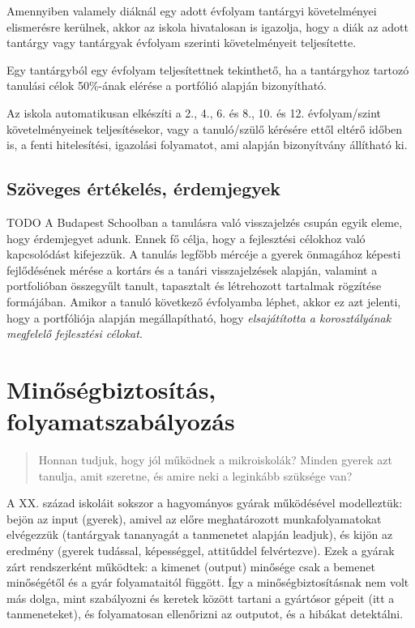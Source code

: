Amennyiben valamely diáknál egy adott évfolyam tantárgyi követelményei elismerésre kerülnek, akkor az iskola hivatalosan is igazolja, hogy a diák az adott tantárgy vagy tantárgyak évfolyam szerinti követelményeit teljesítette.

Egy tantárgyból egy évfolyam teljesítettnek tekinthető, ha a tantárgyhoz tartozó tanulási célok 50\%-ának elérése a portfólió alapján bizonyítható.

Az iskola automatikusan elkészíti a 2., 4., 6. és 8., 10. és 12. évfolyam/szint követelményeinek teljesítésekor, vagy a tanuló/szülő kérésére ettől eltérő időben is, a fenti hitelesítési, igazolási folyamatot, ami alapján bizonyítvány állítható ki.

\subsection{Szöveges értékelés, érdemjegyek}
TODO
A Budapest Schoolban a tanulásra való visszajelzés csupán egyik eleme, hogy érdemjegyet adunk. Ennek fő célja, hogy a fejlesztési célokhoz való kapcsolódást kifejezzük. A tanulás legfőbb mércéje a gyerek önmagához képesti fejlődésének mérése a kortárs és a tanári visszajelzések alapján, valamint a portfolióban összegyűlt tanult, tapasztalt és létrehozott tartalmak rögzítése formájában.  Amikor a tanuló következő évfolyamba léphet, akkor ez azt jelenti, hogy a portfóliója alapján megállapítható, hogy \emph{elsajátította a korosztályának megfelelő fejlesztési célokat}.


\section{Minőségbiztosítás, folyamatszabályozás}
\label{sec:minosegbiztositas}
\begin{quote}
Honnan tudjuk, hogy jól működnek a mikroiskolák? Minden gyerek azt tanulja, amit szeretne, és amire neki a leginkább szüksége van?
\end{quote}

A XX. század iskoláit sokszor a hagyományos gyárak működésével modelleztük: bejön az input (gyerek), amivel az előre meghatározott munkafolyamatokat elvégezzük (tantárgyak tananyagát a tanmenetet alapján leadjuk), és kijön az eredmény (gyerek tudással, képességgel, attitűddel felvértezve). Ezek a gyárak zárt rendszerként működtek: a kimenet (output) minősége csak a bemenet minőségétől és a gyár folyamataitól függött. Így a minőségbiztosításnak nem volt más dolga, mint szabályozni és keretek között tartani a gyártósor gépeit (itt a tanmeneteket), és folyamatosan ellenőrizni az outputot, és a hibákat detektálni.

